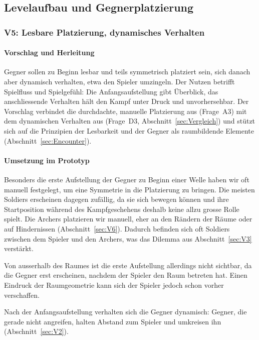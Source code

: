 \documentclass[../Main.tex]{subfiles}
\begin{document}
\subsection{Levelaufbau und Gegnerplatzierung} \label{sec:UmsetzungLevel}

\subsubsection{V5: Lesbare Platzierung, dynamisches Verhalten} \label{sec:V5}

\paragraph{Vorschlag und Herleitung}
Gegner sollen zu Beginn lesbar und teils symmetrisch platziert sein, sich danach aber dynamisch verhalten, etwa den Spieler umzingeln. Der Nutzen betrifft Spielfluss und Spielgefühl: Die Anfangsaufstellung gibt Überblick, das anschliessende Verhalten hält den Kampf unter Druck und unvorhersehbar. Der Vorschlag verbindet die durchdachte, manuelle Platzierung aus  (Frage~A3) mit dem dynamischen Verhalten aus  (Frage~D3, Abschnitt~\ref{sec:Vergleich}) und stützt sich auf die Prinzipien der Lesbarkeit und der Gegner als raumbildende Elemente (Abschnitt~\ref{sec:Encounter}).

\paragraph{Umsetzung im Prototyp}
Besonders die erste Aufstellung der Gegner zu Beginn einer Welle haben wir oft manuell festgelegt, um eine Symmetrie in die Platzierung zu bringen. Die meisten Soldiers erscheinen dagegen zufällig, da sie sich bewegen können und ihre Startposition während des Kampfgeschehens deshalb keine allzu grosse Rolle spielt. Die Archers platzieren wir manuell, eher an den Rändern der Räume oder auf Hindernissen (Abschnitt~\ref{sec:V6}). Dadurch befinden sich oft Soldiers zwischen dem Spieler und den Archers, was das Dilemma aus Abschnitt~\ref{sec:V3} verstärkt.

Von ausserhalb des Raumes ist die erste Aufstellung allerdings nicht sichtbar, da die Gegner erst erscheinen, nachdem der Spieler den Raum betreten hat. Einen Eindruck der Raumgeometrie kann sich der Spieler jedoch schon vorher verschaffen.

Nach der Anfangsaufstellung verhalten sich die Gegner dynamisch: Gegner, die gerade nicht angreifen, halten Abstand zum Spieler und umkreisen ihn (Abschnitt~\ref{sec:V2}).
\end{document}
